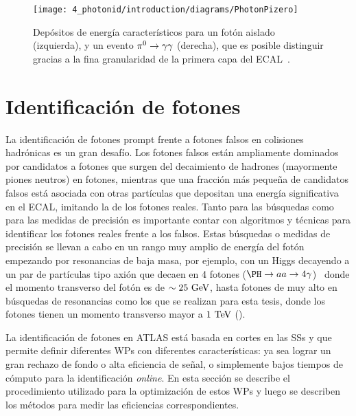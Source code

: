 \begin{figure}[ht!]
    \centering
    \texttt{[image: 4\_photonid/introduction/diagrams/PhotonPizero]}
    \caption{Depósitos de energía característicos para un fotón aislado (izquierda), y un evento \(\pi^{0}\rightarrow\gamma\gamma\) (derecha), que es posible distinguir gracias a la fina granularidad de la primera capa del \ac{ECAL}~\cite{ATLAS-ECAL-Pizero}.}
    \label{fig:pid_ss:ss:pizero}
\end{figure}






\section{Identificación de fotones}
\label{sec:pid_ss:pid}

La identificación de fotones prompt frente a fotones falsos en colisiones hadrónicas es un gran desafío. Los fotones falsos están ampliamente dominados por candidatos a fotones que surgen del decaimiento de hadrones (mayormente piones neutros) en fotones, mientras que una fracción más pequeña de candidatos falsos está asociada con otras partículas que depositan una energía significativa en el \ac{ECAL}, imitando la de los fotones reales.
Tanto para las búsquedas como para las medidas de precisión es importante contar con algoritmos y técnicas para identificar los fotones reales frente a los falsos. Estas búsquedas o medidas de precisión se llevan a cabo en un rango muy amplio de energía del fotón empezando por resonancias de baja masa, por ejemplo, con un Higgs decayendo a un par de partículas tipo axión que decaen en 4 fotones (\(\PH\to aa \to 4\gamma\))~\cite{ATLAS-HiggsTo4Gamma} donde el momento transverso del fotón es de \(\sim 25~\text{GeV}\), hasta fotones de muy alto \pt en búsquedas de resonancias \gammajet como los que se realizan para esta tesis, donde los fotones tienen un momento transverso mayor a \(1~\text{TeV}\) (\Part{\ref{part:search}}).

La identificación de fotones en \ac{ATLAS} está basada en cortes en las \acp{SS} y que permite definir diferentes \acfp{WP} con diferentes características: ya sea lograr un gran rechazo de fondo o alta eficiencia de se\~nal, o simplemente bajos tiempos de cómputo para la identificación \textit{online}. En esta sección se describe el procedimiento utilizado para la optimización de estos \acp{WP} y luego se describen los métodos para medir las eficiencias correspondientes.




